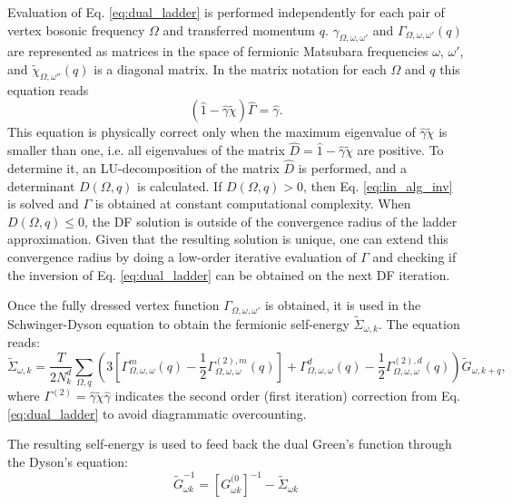 \documentclass[3p,times,procedia]{elsarticle}
\begin{document}
Evaluation of Eq. \ref{eq:dual_ladder} is performed independently for each pair of vertex bosonic frequency $\Omega$ and transferred momentum $q$. 
$\gamma_{\Omega,\omega,\omega'}$ and $\Gamma_{\Omega,\omega,\omega'}(q)$ are represented as matrices in the space of fermionic Matsubara frequencies $\omega$, $\omega'$, and $\tilde\chi_{\Omega,\omega''}(q)$ is a diagonal matrix. 
In the matrix notation for each $\Omega$ and $q$ this equation reads 
\begin{equation}\label{eq:lin_alg_inv}
(\hat 1 - \hat \gamma \tilde \chi)\hat \Gamma  = \hat \gamma.
\end{equation} 
This equation is physically correct only when the maximum eigenvalue of $\hat \gamma \tilde \chi$ is smaller than one, i.e. all eigenvalues of the matrix $\hat D = \hat 1 - \hat \gamma \tilde \chi$ are positive. 
To determine it, an LU-decomposition of the matrix $\hat D$ is performed, and a determinant $D(\Omega, q)$ is calculated.
If $D(\Omega, q) > 0$, then Eq. \ref{eq:lin_alg_inv} is solved and $\Gamma$ is obtained at constant computational complexity.
When $D(\Omega, q) \leq 0$, the DF solution is outside of the convergence radius of the ladder approximation.
Given that the resulting solution is unique, one can extend this convergence radius by doing a low-order iterative evaluation of $\Gamma$ and checking if the inversion of Eq. \ref{eq:dual_ladder} can be obtained on the next DF iteration. 
 
Once the fully dressed vertex function $\Gamma_{\Omega,\omega,\omega'}$ is obtained, it is used in the Schwinger-Dyson equation to obtain the fermionic self-energy $\tilde \Sigma_{\omega, k}$. 
The equation reads:
\begin{equation}\label{eq:sd}
\tilde \Sigma_{\omega, k} = \frac{T}{2 N_k^d}  \sum_{\Omega, q} \left( 3 \left[\Gamma^m_{\Omega,\omega,\omega}(q) - \frac{1}{2}\Gamma^{(2), m}_{\Omega,\omega,\omega}(q) \right] + \Gamma^d_{\Omega,\omega,\omega}(q) - \frac{1}{2}\Gamma^{(2), d}_{\Omega,\omega,\omega}(q)  \right) \tilde G_{\omega, k + q},
\end{equation}
where $\Gamma^{(2)} = \hat \gamma \tilde \chi \hat \gamma $ indicates the second order (first iteration) correction from Eq. \ref{eq:dual_ladder} to avoid diagrammatic overcounting. 

The resulting self-energy is used to feed back the dual Green's function through the Dyson's equation:
\begin{equation}\label{eq:dyson}
\tilde G^{-1}_{\omega k} = \left[G^{(0}_{\omega k}\right]^{-1} - \tilde \Sigma_{\omega k}
\end{equation}
\end{document}
